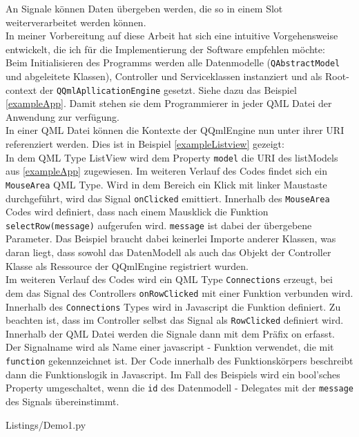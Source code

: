 An Signale können Daten übergeben werden, die so in einem Slot weiterverarbeitet werden können.\\
\vspace{1cm}
In meiner Vorbereitung auf diese Arbeit hat sich eine intuitive Vorgehensweise entwickelt, die ich für die Implementierung
der Software empfehlen möchte:\\
\vspace{1cm}
Beim Initialisieren des Programms werden alle Datenmodelle (\verb|QAbstractModel| und abgeleitete Klassen), Controller
und Serviceklassen instanziert und als Root-context der \verb|QQmlApllicationEngine| gesetzt.
Siehe dazu das Beispiel \ref{exampleApp}.
Damit stehen sie dem Programmierer in jeder QML Datei der Anwendung zur verfügung.\\
In einer QML Datei können die Kontexte der QQmlEngine nun unter ihrer URI referenziert werden.
Dies ist in Beispiel \ref{exampleListview} gezeigt:\\
In dem QML Type \glqq ListView \grqq wird dem Property \verb|model| die URI des listModels aus \ref{exampleApp} zugewiesen.
Im weiteren Verlauf des Codes findet sich ein \verb|MouseArea| QML Type.
Wird in dem Bereich ein Klick mit linker Maustaste durchgeführt, wird das Signal \verb|onClicked| emittiert.
Innerhalb des \verb|MouseArea| Codes wird definiert, dass nach einem Mausklick die Funktion \verb|selectRow(message)|
aufgerufen wird. \verb|message| ist dabei der übergebene Parameter.
Das Beispiel braucht dabei keinerlei Importe anderer Klassen, was daran liegt, dass sowohl das DatenModell als
auch das Objekt der Controller Klasse als Ressource der QQmlEngine registriert wurden.\\
Im weiteren Verlauf des Codes wird ein QML Type \verb|Connections| erzeugt, bei dem das Signal des Controllers \verb|onRowClicked|
mit einer Funktion verbunden wird.
Innerhalb des \verb|Connections| Types wird in Javascript die Funktion definiert.
Zu beachten ist, dass im Controller selbst das Signal als \verb|RowClicked| definiert wird.
Innerhalb der QML Datei werden die Signale dann mit dem Präfix \glqq on \grqq erfasst.
Der Signalname wird als Name einer javascript - Funktion verwendet, die mit \verb|function| gekennzeichnet ist.
Der Code innerhalb des Funktionskörpers beschreibt dann die Funktionslogik in Javascript.
Im Fall des Beispiels wird ein bool'sches Property umgeschaltet, wenn die \verb|id| des Datenmodell - Delegates mit der
\verb|message| des Signals übereinstimmt.

\lstset{
    basicstyle=\small\ttfamily
}
\newpage

{Listings/Demo1.py}\label{exampleApp}

